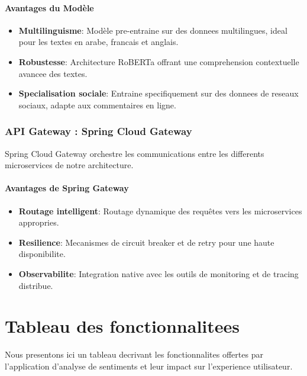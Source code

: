 \paragraph{Avantages du Modèle}
\begin{itemize}
    \item \textbf{Multilinguisme}: Modèle pre-entraine sur des donnees multilingues, ideal pour les textes en arabe, francais et anglais.
    \item \textbf{Robustesse}: Architecture RoBERTa offrant une comprehension contextuelle avancee des textes.
    \item \textbf{Specialisation sociale}: Entraine specifiquement sur des donnees de reseaux sociaux, adapte aux commentaires en ligne.
\end{itemize}

\subsubsection{API Gateway : Spring Cloud Gateway}
Spring Cloud Gateway orchestre les communications entre les differents microservices de notre architecture.

\paragraph{Avantages de Spring Gateway}
\begin{itemize}
    \item \textbf{Routage intelligent}: Routage dynamique des requêtes vers les microservices appropries.
    \item \textbf{Resilience}: Mecanismes de circuit breaker et de retry pour une haute disponibilite.
    \item \textbf{Observabilite}: Integration native avec les outils de monitoring et de tracing distribue.
\end{itemize}


\section{Tableau des fonctionnalitees}
Nous presentons ici un tableau decrivant les fonctionnalites offertes par l'application d'analyse de sentiments et leur impact sur l'experience utilisateur.


